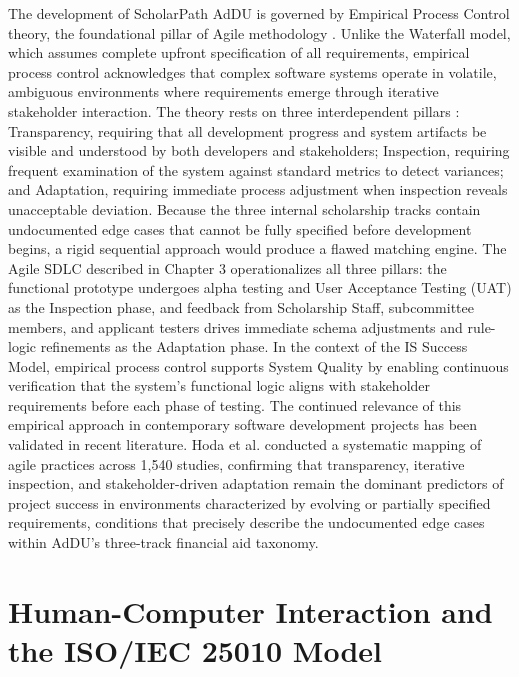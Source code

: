 The development of ScholarPath AdDU is governed by Empirical Process Control theory, the foundational pillar of Agile methodology \cite{ref39}. Unlike the Waterfall model, which assumes complete upfront specification of all requirements, empirical process control acknowledges that complex software systems operate in volatile, ambiguous environments where requirements emerge through iterative stakeholder interaction. The theory rests on three interdependent pillars \cite{ref39}: Transparency, requiring that all development progress and system artifacts be visible and understood by both developers and stakeholders; Inspection, requiring frequent examination of the system against standard metrics to detect variances; and Adaptation, requiring immediate process adjustment when inspection reveals unacceptable deviation. Because the three internal scholarship tracks contain undocumented edge cases that cannot be fully specified before development begins, a rigid sequential approach would produce a flawed matching engine. The Agile SDLC described in Chapter 3 operationalizes all three pillars: the functional prototype undergoes alpha testing and User Acceptance Testing (UAT) as the Inspection phase, and feedback from Scholarship Staff, subcommittee members, and applicant testers drives immediate schema adjustments and rule-logic refinements as the Adaptation phase. In the context of the IS Success Model, empirical process control supports System Quality by enabling continuous verification that the system's functional logic aligns with stakeholder requirements before each phase of testing. The continued relevance of this empirical approach in contemporary software development projects has been validated in recent literature. Hoda et al. \cite{ref27} conducted a systematic mapping of agile practices across 1,540 studies, confirming that transparency, iterative inspection, and stakeholder-driven adaptation remain the dominant predictors of project success in environments characterized by evolving or partially specified requirements, conditions that precisely describe the undocumented edge cases within AdDU's three-track financial aid taxonomy.

\section{Human-Computer Interaction and the ISO/IEC 25010 Model}

